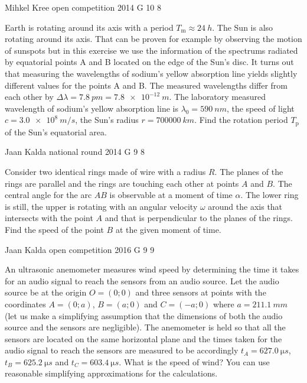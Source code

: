 \documentclass[11pt]{article}
\begin{document}
{Mihkel Kree} %
{open competition} %
{2014} %
{G 10} %
{8} %
{

\ifEngStatement
Earth is rotating around its axis with a period $T_\text{m}\approx\SI{24}{h}$. The Sun is also rotating around its axis. That can be proven for example by observing the motion of sunspots but in this exercise we use the information of the spectrums radiated by equatorial points A and B located on the edge of the Sun’s disc. It turns out that measuring the wavelengths of sodium’s yellow absorption line yields slightly different values for the points A and B. The measured wavelengths differ from each other by $\Delta \lambda = \SI{7.8}{pm}=\SI{7.8e-12}{m}$. The laboratory measured wavelength of sodium’s yellow absorption line is $\lambda_0=\SI{590}{nm}$, the speed of light $c=\SI{3.0e8}{m/s}$, the Sun’s radius $r=\SI{700000}{km}$. Find the rotation period $T_\text{p}$ of the Sun’s equatorial area.
\fi
}

{Jaan Kalda} %
{national round} %
{2014} %
{G 9} %
{8} %
{

\ifEngStatement
Consider two identical rings made of wire with a radius $R$. The planes of the rings are parallel and the rings are touching each other at points $A$ and $B$. The central angle for the arc $AB$ is observable at a moment of time $\alpha$. The lower ring is still, the upper is rotating with an angular velocity $\omega$ around the axis that intersects with the point $A$ and that is perpendicular to the planes of the rings. Find the speed of the point $B$ at the given moment of time.
\fi
}

{Jaan Kalda} %
{open competition} %
{2016} %
{G 9} %
{9} %
{

\ifEngStatement
An ultrasonic anemometer measures wind speed by determining the time it takes for an audio signal to reach the sensors from an audio source. Let the audio source be at the origin $O=(0;0)$ and three sensors at points with the coordinates $A=(0;a)$, $B=(a;0)$ and $C=(-a;0)$ where $a=\SI{211.1}{mm}$ (let us make a simplifying assumption that the dimensions of both the audio source and the sensors are negligible). The anemometer is held so that all the sensors are located on the same horizontal plane and the times taken for the audio signal to reach the sensors are measured to be accordingly $t_A=\SI{627,0}{\micro s}$, $t_B=\SI{625,2}{\micro s}$ and $t_C=\SI{603,4}{\micro s}$. What is the speed of wind? You can use reasonable simplifying approximations for the calculations.
\fi
}
\end{document}
